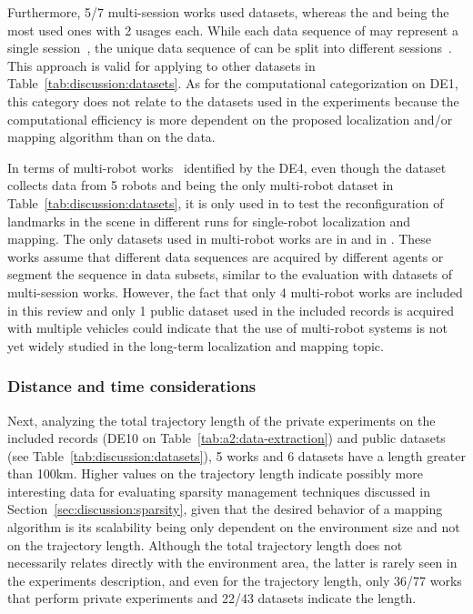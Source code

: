 Furthermore, 5/7 multi-session works used datasets, whereas the  and  being the most used ones with 2 usages each. While each data sequence of  may represent a single session~\parencite{lázaro-et-al:2018:8594310}, the unique data sequence of  can be split into different sessions~\cite{latif-et-al:2012:6385879}. This approach is valid for applying to other datasets in Table~\ref{tab:discussion:datasets}.
As for the computational categorization on DE1, this category does not relate to the datasets used in the experiments because the computational efficiency is more dependent on the proposed localization and/or mapping algorithm than on the data.

In terms of multi-robot works~\parencite{gadd-newman:2016:7759843,zhang-et-al:2018:1729881418780178,karaoguz-bozma:2020:2,yue-et-al:2020:9197072} identified by the DE4, even though the dataset  collects data from 5 robots and being the only multi-robot dataset in Table~\ref{tab:discussion:datasets}, it is only used in \cite{nobre-et-al:2018:8461111} to test the reconfiguration of landmarks in the scene in different runs for single-robot localization and mapping. The only datasets used in multi-robot works are  in \cite{zhang-et-al:2018:1729881418780178} and  in \cite{karaoguz-bozma:2020:2}. These works assume that different data sequences are acquired by different agents or segment the sequence in data subsets, similar to the evaluation with datasets of multi-session works.
However, the fact that only 4 multi-robot works are included in this review and only 1 public dataset used in the included records is acquired with multiple vehicles could indicate that the use of multi-robot systems is not yet widely studied in the long-term localization and mapping topic.



\subsubsection{Distance and time considerations}

Next, analyzing the total trajectory length of the private experiments on the included records (DE10 on Table~\ref{tab:a2:data-extraction}) and public datasets (see Table~\ref{tab:discussion:datasets}), 5 works and 6 datasets have a length greater than 100km.
Higher values on the trajectory length indicate possibly more interesting data for evaluating sparsity management techniques discussed in Section~\ref{sec:discussion:sparsity}, given that the desired behavior of a mapping algorithm is its scalability being only dependent on the environment size and not on the trajectory length. Although the total trajectory length does not necessarily relates directly with the environment area, the latter is rarely seen in the experiments description, and even for the trajectory length, only 36/77 works that perform private experiments and 22/43 datasets indicate the length.

